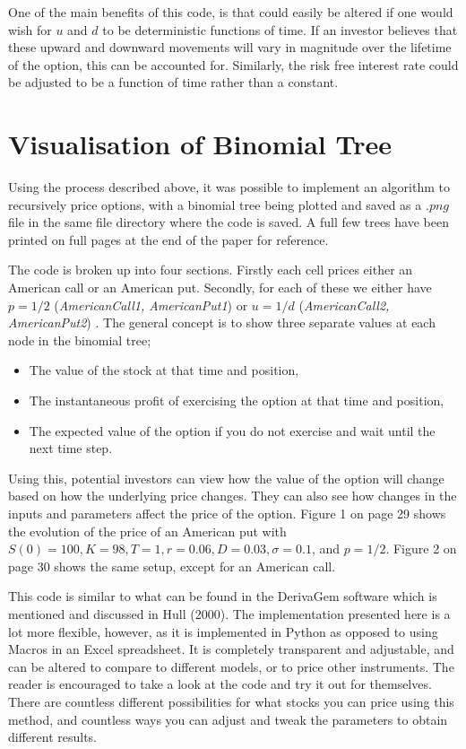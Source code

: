 \documentclass[letterpaper,12pt]{article}
\theoremstyle{plain}
\numberwithin{equation}{section}
\begin{document}
One of the main benefits of this code, is that could easily be altered if one would wish for $u$ and $d$ to be deterministic functions of time. If an investor believes that these upward and downward movements will vary in magnitude over the lifetime of the option, this can be accounted for. Similarly, the risk free interest rate could be adjusted to be a function of time rather than a constant.




\section{Visualisation of Binomial Tree}

Using the process described above, it was possible to implement an algorithm to recursively price options, with a binomial tree being plotted and saved as a $.png$ file in the same file directory where the code is saved. A full few trees have been printed on full pages at the end of the paper for reference. 

The code is broken up into four sections. Firstly each cell prices either an American call or an American put. Secondly, for each of these we either have $p = 1/2$ ({\em AmericanCall1, AmericanPut1}) or $u = 1/d$ ({\em AmericanCall2, AmericanPut2}) . The general concept is to show three separate values at each node in the binomial tree;
\begin{itemize}
	\item The value of the stock at that time and position,
	\item The instantaneous profit of exercising the option at that time and position,
	\item The expected value of the option if you do not exercise and wait until the next time step.
\end{itemize}

Using this, potential investors can view how the value of the option will change based on how the underlying price changes. They can also see how changes in the inputs and parameters affect the price of the option. Figure 1 on page 29 shows the evolution of the price of an American put with $S(0) = 100, K = 98, T = 1, r = 0.06, D = 0.03,  \sigma = 0.1$, and $p=1/2$. Figure 2 on page 30 shows the same setup, except for an American call.

This code is similar to what can be found in the DerivaGem software which is mentioned and discussed in Hull (2000). The implementation presented here is a lot more flexible, however, as it is implemented in Python as opposed to using Macros in an Excel spreadsheet. It is completely transparent and adjustable, and can be altered to compare to different models, or to price other instruments. The reader is encouraged to take a look at the code and try it out for themselves. There are countless different possibilities for what stocks you can price using this method, and countless ways you can adjust and tweak the parameters to obtain different results.
\end{document}
